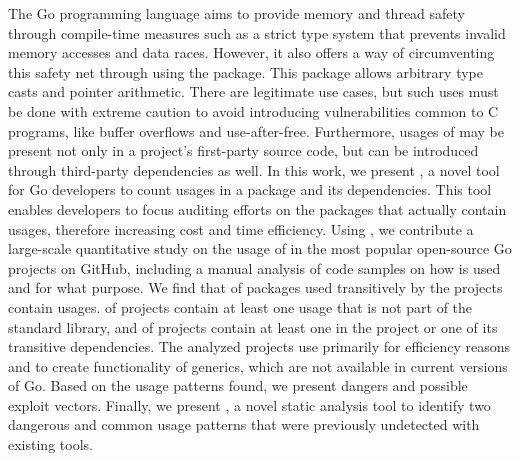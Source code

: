 The Go programming language aims to provide memory and thread safety through compile-time measures such as a strict type system that prevents invalid memory accesses and data races. However, it also offers a way of circumventing this safety net through using the \unsafe{} package.
This package allows arbitrary type casts and pointer arithmetic.
There are legitimate use cases, but such uses must be done with extreme caution to avoid introducing vulnerabilities common to C programs, like buffer overflows and use-after-free.
Furthermore, usages of \unsafe{} may be present not only in a project's first-party source code, but can be introduced through third-party dependencies as well.
In this work, we present \toolUsage{}, a novel tool for Go developers to count \unsafe{} usages in a package and its dependencies.
This tool enables developers to focus auditing efforts on the packages that actually contain \unsafe{} usages, therefore increasing cost and time efficiency.
Using \toolUsage{}, we contribute a large-scale quantitative study on the usage of \unsafe{} in the \projsAnalyzed{} most popular open-source Go projects on GitHub, including a manual analysis of \numberCodeSnippets{} code samples on how \unsafe{} is used and for what purpose.
We find that \percentagePackagesWithUnsafe{} of packages used transitively by the projects contain \unsafe{} usages. 
\percentageProjectsWithUnsafe{} of projects contain at least one usage that is not part of the standard library, and \percentageProjectsAndDependenciesUnsafe{} of projects contain at least one \unsafe{} in the project or one of its transitive dependencies.
The analyzed projects use \unsafe{} primarily for efficiency reasons and to create functionality of generics, which are not available in current versions of Go.
Based on the usage patterns found, we present dangers and possible exploit vectors. Finally, we present \toolSA{}, a novel static analysis tool to identify two dangerous and common usage patterns that were previously undetected with existing tools.
